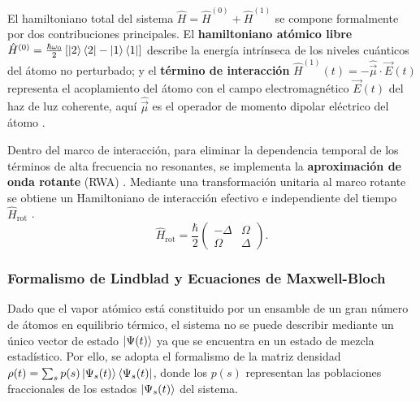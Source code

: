 El hamiltoniano total del sistema $\hat{H} = \hat{H}^{(0)} + \hat{H}^{(1)}$ se compone formalmente por dos contribuciones principales. El \textbf{hamiltoniano atómico libre} $\hat{H}^{(0)} = \frac{\hbar \omega_0}{2} \left[\ket{2}\bra{2}-\ket{1}\bra{1}\right]$ describe la energía intrínseca de los niveles cuánticos del átomo no perturbado; y el \textbf{término de interacción} $\hat{H}^{(1)}(t) = - \hat{\vec{\mu}} \cdot \vec{E}(t)$ representa el acoplamiento del átomo con el campo electromagnético $\vec{E}(t)$ del haz de luz coherente, aquí $\hat{\vec{\mu}}$ es el operador de momento dipolar eléctrico del átomo \cite{robertw.boydNonlinearOptics, allenOpticalResonanceTwolevel1975}.
    
Dentro del marco de interacción, para eliminar la dependencia temporal de los términos de alta frecuencia no resonantes, se implementa la \textbf{aproximación de onda rotante} (RWA) \cite{robertw.boydNonlinearOptics}. Mediante una transformación unitaria al marco rotante se obtiene un Hamiltoniano de interacción efectivo e independiente del tiempo $\hat{H}_{\text{rot}}$ \cite{scullyQuantumOptics1997,gerryIntroductoryQuantumOptics}.
\begin{equation}
\hat{H}_{\text{rot}} = \frac{\hbar}{2}\begin{pmatrix} -\Delta & \Omega \\ \Omega & \Delta \end{pmatrix}.
\end{equation}
\subsubsection*{Formalismo de Lindblad y Ecuaciones de Maxwell-Bloch}
Dado que el vapor atómico está constituido por un ensamble de un gran número de átomos en equilibrio térmico, el sistema no se puede describir mediante un único vector de estado $\ket{\Psi(t)}$ ya que se encuentra en un estado de mezcla estadístico. Por ello, se adopta el formalismo de la matriz densidad $\rho(t) = \sum_s p(s) \ket{\Psi_s(t)} \bra{\Psi_s(t)}$, donde los $p(s)$ representan las poblaciones fraccionales de los estados $\ket{\Psi_s(t)}$ del sistema.


